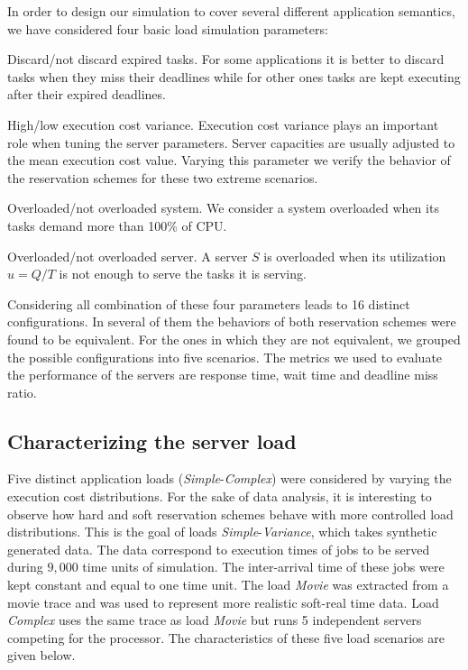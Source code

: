 \documentclass[12pt]{article}
\newcommand{\Lum}{\textit{Simple}}
\newcommand{\Ltres}{\textit{Variance}}
\newcommand{\Lquatro}{\textit{Movie}}
\newcommand{\Lcinco}{\textit{Complex}}
\begin{document}
In order to design our simulation to cover several different
application semantics, we have considered four basic load simulation
parameters:
\begin{description}
\item Discard/not discard expired tasks. For some applications it is
  better to discard tasks when they miss their deadlines while for
  other ones tasks are kept executing after their expired deadlines.
\item High/low execution cost variance. Execution cost variance plays
  an important role when tuning the server parameters. Server
  capacities are usually adjusted to the mean execution cost
  value. Varying this parameter we verify the behavior of the
  reservation schemes for these two extreme scenarios.
\item Overloaded/not overloaded system. We consider a system
  overloaded when its tasks demand more than 100\% of CPU.
\item Overloaded/not overloaded server. A server $S$ is overloaded
  when its utilization $u = Q/T$ is not enough to serve the tasks it
  is serving.
\end{description}

Considering all combination of these four parameters leads to 16
distinct configurations. In several of them the behaviors of both
reservation schemes were found to be equivalent.  For the ones in
which they are not equivalent, we grouped the possible configurations
into five scenarios. The metrics we used to evaluate the performance
of the servers are response time, wait time and deadline miss ratio.

\subsection{Characterizing the server load}
\label{sec:charact-server-load}

Five distinct application loads (\Lum{}-\Lcinco{}) were considered by varying the
execution cost distributions.  For the sake of data analysis, it is
interesting to observe how hard and soft reservation schemes behave
with more controlled load distributions. This is the goal of loads
\Lum{}-\Ltres{}, which takes synthetic generated data. The data correspond to
execution times of jobs to be served during $9,000$ time units of
simulation.  The inter-arrival time of these jobs were kept constant
and equal to one time unit.  The load \Lquatro{} was extracted from a movie
trace and was used to represent more realistic soft-real time
data. Load \Lcinco{} uses the same trace as load \Lquatro{} but runs 5 independent
servers competing for the processor. The characteristics of these five
load scenarios are given below.
\end{document}
